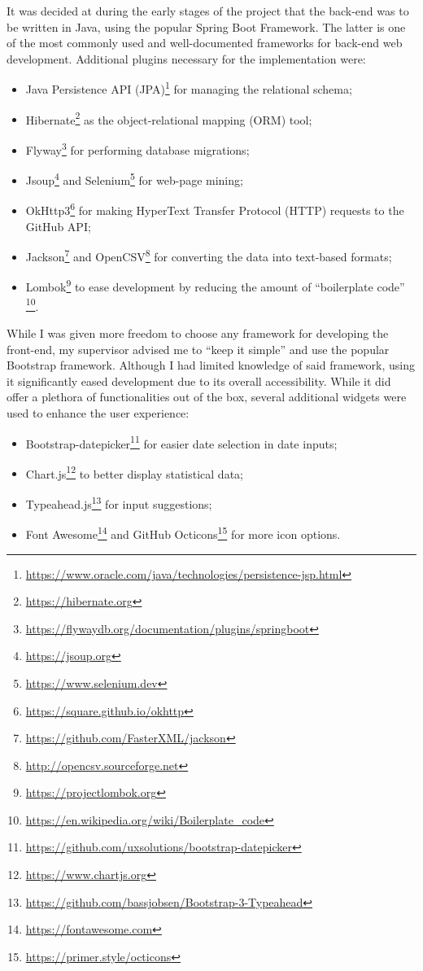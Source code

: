 It was decided at during the early stages of the project that the back-end was to be written in Java, using the popular Spring Boot Framework.
The latter is one of the most commonly used and well-documented frameworks for back-end web development. Additional plugins necessary for the implementation were:
\begin{itemize}
    \item Java Persistence API (JPA)\footnote{\url{https://www.oracle.com/java/technologies/persistence-jsp.html}} for managing the relational schema;
    \item Hibernate\footnote{\url{https://hibernate.org}} as the object-relational mapping (ORM) tool;
    \item Flyway\footnote{\url{https://flywaydb.org/documentation/plugins/springboot}} for performing database migrations;
    \item Jsoup\footnote{\url{https://jsoup.org}} and Selenium\footnote{\url{https://www.selenium.dev}} for web-page mining;
    \item OkHttp3\footnote{\url{https://square.github.io/okhttp}} for making HyperText Transfer Protocol (HTTP) requests to the GitHub API;
    \item Jackson\footnote{\url{https://github.com/FasterXML/jackson}} and OpenCSV\footnote{\url{http://opencsv.sourceforge.net}} for converting the data into text-based formats;
    \item Lombok\footnote{\url{https://projectlombok.org}} to ease development by reducing the amount of ``boilerplate code'' \footnote{\url{https://en.wikipedia.org/wiki/Boilerplate_code}}.
\end{itemize}

While I was given more freedom to choose any framework for developing the front-end, my supervisor advised me to ``keep it simple'' and use the popular Bootstrap framework.
Although I had limited knowledge of said framework, using it significantly eased development due to its overall accessibility.
While it did offer a plethora of functionalities out of the box, several additional widgets were used to enhance the user experience:
\begin{itemize}
    \item Bootstrap-datepicker\footnote{\url{https://github.com/uxsolutions/bootstrap-datepicker}} for easier date selection in date inputs;
    \item Chart.js\footnote{\url{https://www.chartjs.org}} to better display statistical data;
    \item Typeahead.js\footnote{\url{https://github.com/bassjobsen/Bootstrap-3-Typeahead}} for input suggestions;
    \item Font Awesome\footnote{\url{https://fontawesome.com}} and GitHub Octicons\footnote{\url{https://primer.style/octicons}} for more icon options.
\end{itemize}

